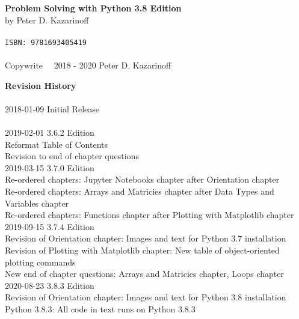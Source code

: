 
\textbf{Problem Solving with Python 3.8 Edition} \\
by Peter D. Kazarinoff \\
\\
\texttt{ISBN: 9781693405419} \\
\\
Copywrite \  \textcopyright \  2018 - 2020 Peter D. Kazarinoff\\

\vspace{3in}

\textbf{Revision History}\\
\\
2018-01-09 Initial Release\\
\\
2019-02-01 3.6.2 Edition\\
Reformat Table of Contents\\
Revision to end of chapter questions\\

2019-03-15 3.7.0 Edition \\
Re-ordered chapters: Jupyter Notebooks chapter after Orientation chapter \\
Re-ordered chapters: Arrays and Matricies chapter after Data Types and Variables chapter \\
Re-ordered chapters: Functions chapter after Plotting with Matplotlib chapter \\

2019-09-15 3.7.4 Edition \\
Revision of Orientation chapter: Images and text for Python 3.7 installation \\
Revision of Plotting with Matplotlib chapter: New table of object-oriented plotting commands \\
New end of chapter questions: Arrays and Matricies chapter, Loops chapter \\

2020-08-23 3.8.3 Edition \\
Revision of Orientation chapter: Images and text for Python 3.8 installation \\
Python 3.8.3: All code in text runs on Python 3.8.3 \\
